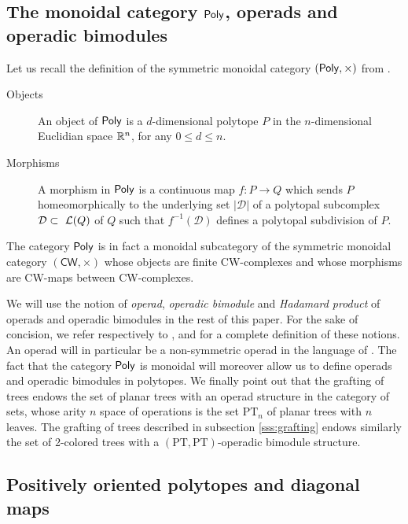 \documentclass[twoside, 12pt]{amsart}
\theoremstyle{remark}
\begin{document}
 
\subsection{The monoidal category $\mathsf{Poly}$, operads and operadic bimodules}

Let us recall the definition of the symmetric monoidal category $(\mathsf{Poly}, \times)$ from \cite[Section~2.1]{MTTV19}.
\begin{description}
\item[{\sc Objects}] An object of $\mathsf{Poly}$ is a $d$-dimensional  polytope $P$ in the $n$-dimensional Euclidian space $\mathbb{R}^n$, for any $0\leq d\leq n$.
\item[{\sc Morphisms}] A morphism in $\mathsf{Poly}$ is a continuous map  $f: P\to Q$ which sends  $P$ homeomorphically to the underlying set $|\mathcal{D}|$ of a polytopal subcomplex $\mathcal{D}\subset~\mathcal{L}(Q)$ of $Q$ 
such that $f^{-1}(\mathcal D)$ defines a polytopal subdivision of $P$.
\end{description}
The category $\mathsf{Poly}$ is in fact a monoidal subcategory of the symmetric monoidal category $(\mathsf{CW},\times )$ whose objects are finite CW-complexes and whose morphisms are CW-maps between CW-complexes.

We will use the notion of \textit{operad}, \textit{operadic bimodule} and \textit{Hadamard product} of operads and operadic bimodules in the rest of this paper. For the sake of concision, we refer respectively to \cite[I, Section 1.1.1]{Mazuir21}, \cite[I, Section 1.1.3]{Mazuir21} and \cite[Section 5.1.12]{LodayVallette12} for a complete definition of these notions. An operad will in particular be a non-symmetric operad in the language of \cite{LodayVallette12}. The fact that the category $\mathsf{Poly}$ is monoidal will moreover allow us to define operads and operadic bimodules in polytopes. 
We finally point out that the grafting of trees endows the set of planar trees with an operad structure in the category of sets, whose arity $n$ space of operations is the set $\mathrm{PT}_n$ of planar trees with $n$ leaves. 
The grafting of trees described in subsection \ref{sss:grafting} endows similarly the set of 2-colored trees with a $(\mathrm{PT},\mathrm{PT})$-operadic bimodule structure. 

\subsection{Positively oriented polytopes and diagonal maps}
\end{document}
